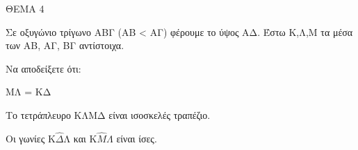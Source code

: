 
ΘΕΜΑ 4

Σε οξυγώνιο τρίγωνο ΑΒΓ (ΑΒ \textless{} ΑΓ) φέρουμε το ύψος ΑΔ. Έστω Κ,Λ,Μ τα μέσα των ΑΒ, ΑΓ, ΒΓ αντίστοιχα.

Να αποδείξετε ότι:

\begin{alist}
\item ΚΛ // ΒΓ 

\item

.}
\end{alist}
\begin{alist}
\item
  ΜΛ = ΚΔ 
\item
  Το τετράπλευρο ΚΛΜΔ είναι ισοσκελές τραπέζιο. 

\item Οι γωνίες Κ$\widehat{\Delta}\text{Λ}$ και $\text{Κ}\widehat{Μ}\Lambda$ είναι ίσες. 
\end{alist}
